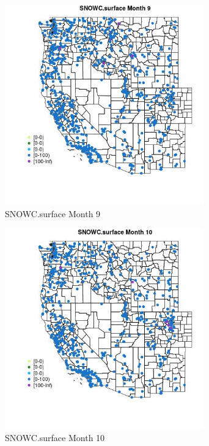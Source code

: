 \begin{figure} 
\centering  
\includegraphics[width=0.77\textwidth]{Code_Outputs/Report_ML_input_PM25_Step4_part_e_de_duplicated_aves_compiled_2019-05-21wNAs_MapObsMo9SNOWCsurface.jpg} 
\caption{\label{fig:Report_ML_input_PM25_Step4_part_e_de_duplicated_aves_compiled_2019-05-21wNAsMapObsMo9SNOWCsurface}SNOWC.surface Month 9} 
\end{figure} 
 

\clearpage 

\begin{figure} 
\centering  
\includegraphics[width=0.77\textwidth]{Code_Outputs/Report_ML_input_PM25_Step4_part_e_de_duplicated_aves_compiled_2019-05-21wNAs_MapObsMo10SNOWCsurface.jpg} 
\caption{\label{fig:Report_ML_input_PM25_Step4_part_e_de_duplicated_aves_compiled_2019-05-21wNAsMapObsMo10SNOWCsurface}SNOWC.surface Month 10} 
\end{figure} 
 

